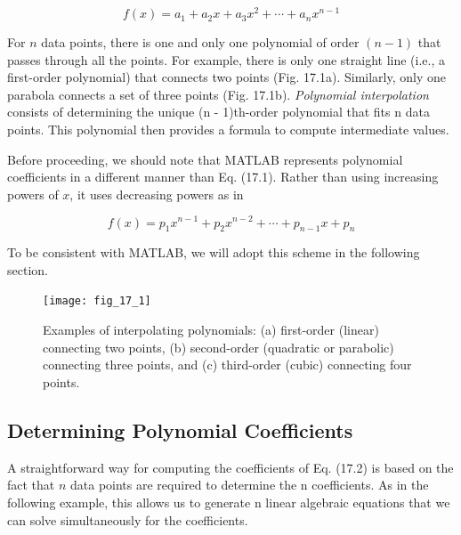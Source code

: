 \documentclass[../main.tex]{subfiles}
\begin{document}
\begin{equation}
	\tag{17.1}
	f(x) = a_1 + a_2 x + a_3 x^2 + \cdots + a_n x^{n-1}
\end{equation}

For $n$ data points, there is one and only one polynomial of order $(n - 1)$ that passes through
all the points. For example, there is only one straight line (i.e., a first-order polynomial)
that connects two points (Fig. 17.1a). Similarly, only one parabola connects a set of three
points (Fig. 17.1b). \textit{Polynomial interpolation} consists of determining the unique (n - 1)th-order polynomial that fits n data points. This polynomial then provides a formula to
compute intermediate values.

Before proceeding, we should note that MATLAB represents polynomial coefficients
in a different manner than Eq. (17.1). Rather than using increasing powers of $x$, it uses decreasing powers as in

\begin{equation}
	\tag{17.2}
	f(x) = p_1 x ^ {n-1} + p_2 x ^ {n-2} + \cdots + p_{n-1} x + p_n
\end{equation}

\noindent To be consistent with MATLAB, we will adopt this scheme in the following section.

\begin{figure}[H] 
	\centering
	\texttt{[image: fig\_17\_1]}
	\caption{\textsf{Examples of interpolating polynomials: (a) first-order (linear) connecting two points,
	(b) second-order (quadratic or parabolic) connecting three points, and (c) third-order (cubic)
	connecting four points.}}
	\label{fig:fig_17_1}
\end{figure}

\label{cha:cha_P_17_1_1}
\subsection{Determining Polynomial Coefficients}

\noindent A straightforward way for computing the coefficients of Eq. (17.2) is based on the fact that
$n$ data points are required to determine the n coefficients. As in the following example, this
allows us to generate n linear algebraic equations that we can solve simultaneously for the
coefficients.
\end{document}
